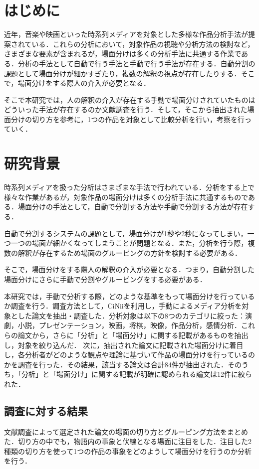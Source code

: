 

\section{はじめに}
近年，音楽や映画といった時系列メディアを対象とした多様な作品分析手法が提案されている．これらの分析において，対象作品の視聴や分析方法の検討など，さまざまな要素が含まれるが，場面分けは多くの分析手法に共通する作業である．分析の手法として自動で行う手法と手動で行う手法が存在する．自動分割の課題として場面分けが細かすぎたり，複数の解釈の視点が存在したりする．そこで，場面分けをする際人の介入が必要となる．

そこで本研究では，人の解釈の介入が存在する手動で場面分けされていたものはどういった手法が存在するのか文献調査を行う．そして，そこから抽出された場面分けの切り方を参考に，1つの作品を対象として比較分析を行い，考察を行っていく．
\section{研究背景}
時系列メディアを扱った分析はさまざまな手法で行われている．分析をする上で様々な作業があるが，対象作品の場面分けは多くの分析手法に共通するものである．場面分けの手法として，自動で分割する方法や手動で分割する方法が存在する．

自動で分割するシステムの課題として，場面分けが1秒や2秒になってしまい，一つ一つの場面が細かくなってしまうことが問題となる．また，分析を行う際，複数の解釈が存在するため場面のグルーピングの方針を検討する必要がある．

そこで，場面分けをする際人の解釈の介入が必要となる．つまり，自動分割した場面分けにさらに手動で分割やグルーピングをする必要がある．

本研究では，手動で分析する際，どのような基準をもって場面分けを行っているか調査を行う．調査方法として，CiNii\cite{CiNii}を利用し，手動によるメディア分析を対象とした論文を抽出・調査した．分析対象は以下の8つのカテゴリに絞った：演劇，小説，プレゼンテーション，映画，将棋，映像，作品分析，感情分析．これらの論文から，さらに「分析」と「場面分け」に関する記載があるものを抽出し，対象を絞り込んだ．
次に，抽出された論文に記載された場面分けに着目し，各分析者がどのような観点や理論に基づいて作品の場面分けを行っているのかを調査を行った．その結果，該当する論文は合計84件が抽出された．そのうち，「分析」と「場面分け」に関する記載が明確に認められる論文は12件に絞られた．
\subsection{調査に対する結果}
文献調査によって選定された論文の場面の切り方とグルーピング方法をまとめた．切り方の中でも，物語内の事象と伏線となる場面に注目をした．注目した2種類の切り方を使って1つの作品の事象をどのようして場面分けを行うのか分析を行う．

